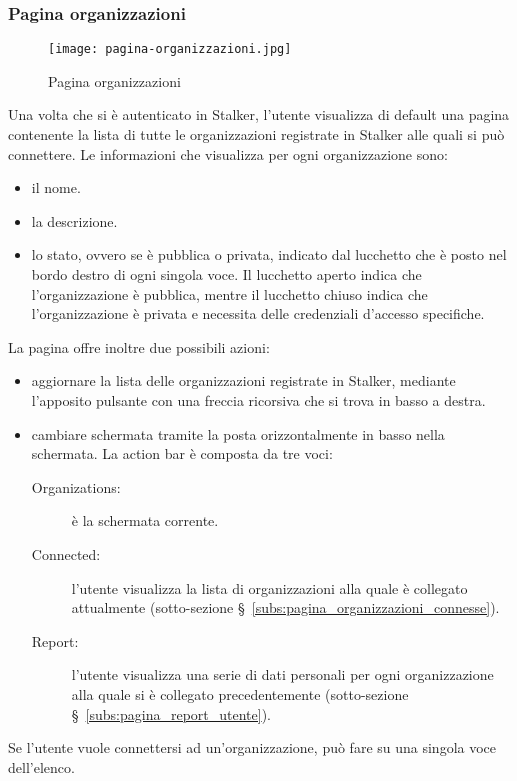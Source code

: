 \documentclass[../manuale-utente.tex]{subfiles}
\begin{document}
\subsubsection{Pagina organizzazioni}%
\label{subs:pagina_organizzazioni}

\begin{figure}[H]
    \centering
    \texttt{[image: pagina-organizzazioni.jpg]}
    \caption{Pagina organizzazioni}%
    \label{fig:mobile_app_pagina_organizzazioni}
\end{figure}
Una volta che si è autenticato in Stalker, l'utente visualizza di default una pagina contenente la lista di tutte le organizzazioni registrate in Stalker alle quali si può connettere.
Le informazioni che visualizza per ogni organizzazione sono:
\begin{itemize}
  \item il nome.
  \item la descrizione.
  \item lo stato, ovvero se è pubblica o privata, indicato dal lucchetto che è posto nel bordo destro di ogni singola voce. Il lucchetto aperto indica che l'organizzazione è pubblica, mentre il lucchetto chiuso indica che l'organizzazione è privata e necessita delle credenziali d'accesso specifiche.
\end{itemize}
La pagina offre inoltre due possibili azioni:
\begin{itemize}
  \item aggiornare la lista delle organizzazioni registrate in Stalker, mediante l'apposito pulsante con una freccia ricorsiva che si trova in basso a destra.
  \item cambiare schermata tramite la  posta orizzontalmente in basso nella schermata. La action bar è composta da tre voci:
  \begin{description}
    \item[Organizations:] è la schermata corrente.
    \item[Connected:] l'utente visualizza la lista di organizzazioni alla quale è collegato attualmente (sotto-sezione §~\ref{subs:pagina_organizzazioni_connesse}).
    \item[Report:] l'utente visualizza una serie di dati personali per ogni organizzazione alla quale si è collegato precedentemente (sotto-sezione §~\ref{subs:pagina_report_utente}).
  \end{description}
\end{itemize}
Se l'utente vuole connettersi ad un'organizzazione, può fare  su una singola voce dell'elenco.
\end{document}
